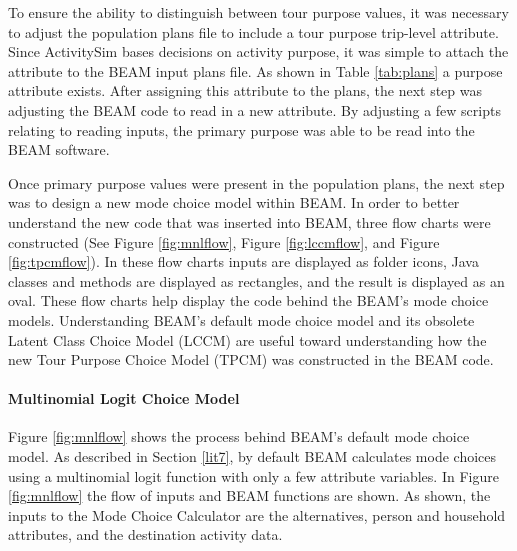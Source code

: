 \documentclass[3p, authoryear, review]{elsarticle} %
\begin{document}
To ensure the ability to distinguish between tour purpose values, it was necessary to adjust the population plans file to include a tour purpose trip-level attribute. Since ActivitySim bases decisions on activity purpose, it was simple to attach the attribute to the BEAM input plans file. As shown in Table \ref{tab:plans} a purpose attribute exists. After assigning this attribute to the plans, the next step was adjusting the BEAM code to read in a new attribute. By adjusting a few scripts relating to reading inputs, the primary purpose was able to be read into the BEAM software.

Once primary purpose values were present in the population plans, the next step was to design a new mode choice model within BEAM. In order to better understand the new code that was inserted into BEAM, three flow charts were constructed (See Figure \ref{fig:mnlflow}, Figure \ref{fig:lccmflow}, and Figure \ref{fig:tpcmflow}). In these flow charts inputs are displayed as folder icons, Java classes and methods are displayed as rectangles, and the result is displayed as an oval. These flow charts help display the code behind the BEAM's mode choice models. Understanding BEAM's default mode choice model and its obsolete Latent Class Choice Model (LCCM) are useful toward understanding how the new Tour Purpose Choice Model (TPCM) was constructed in the BEAM code.

\hypertarget{multinomial-logit-choice-model}{%
\paragraph{Multinomial Logit Choice Model}\label{multinomial-logit-choice-model}}

Figure \ref{fig:mnlflow} shows the process behind BEAM's default mode choice model. As described in Section \ref{lit7}, by default BEAM calculates mode choices using a multinomial logit function with only a few attribute variables. In Figure \ref{fig:mnlflow} the flow of inputs and BEAM functions are shown. As shown, the inputs to the Mode Choice Calculator are the alternatives, person and household attributes, and the destination activity data.
\end{document}
